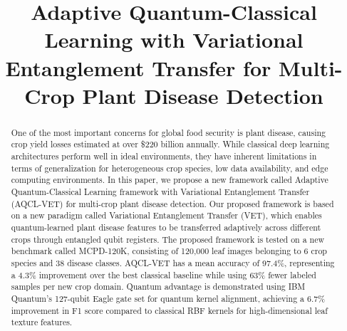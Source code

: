 \documentclass[conference]{IEEEtran}
\begin{document}
\title{Adaptive Quantum-Classical Learning with Variational Entanglement Transfer for Multi-Crop Plant Disease Detection}

\author{
\and
{}
\and
{}
}

\maketitle

\begin{abstract}
One of the most important concerns for global food security is plant disease, causing crop yield losses estimated at over \$220 billion annually. While classical deep learning architectures perform well in ideal environments, they have inherent limitations in terms of generalization for heterogeneous crop species, low data availability, and edge computing environments. In this paper, we propose a new framework called Adaptive Quantum-Classical Learning framework with Variational Entanglement Transfer (AQCL-VET) for multi-crop plant disease detection. Our proposed framework is based on a new paradigm called Variational Entanglement Transfer (VET), which enables quantum-learned plant disease features to be transferred adaptively across different crops through entangled qubit registers. The proposed framework is tested on a new benchmark called MCPD-120K, consisting of 120,000 leaf images belonging to 6 crop species and 38 disease classes. AQCL-VET has a mean accuracy of 97.4\%, representing a 4.3\% improvement over the best classical baseline while using 63\% fewer labeled samples per new crop domain. Quantum advantage is demonstrated using IBM Quantum's 127-qubit Eagle gate set for quantum kernel alignment, achieving a 6.7\% improvement in F1 score compared to classical RBF kernels for high-dimensional leaf texture features.
\end{abstract}
\end{document}
